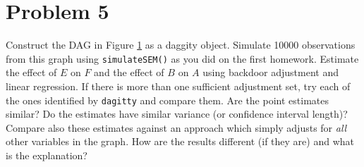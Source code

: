 \documentclass[letterpaper]{article}
\begin{document}
\section*{Problem 5}

Construct the DAG in Figure \ref{fig:prob6} as a daggity object. Simulate 10000 observations from this graph using \texttt{simulateSEM()} as you did on the first homework. Estimate the effect of $E$ on $F$ and the effect of $B$ on $A$ using backdoor adjustment and linear regression. If there is more than one sufficient adjustment set, try each of the ones identified by \texttt{dagitty} and compare them. Are the point estimates similar? Do the estimates have similar variance (or confidence interval length)? Compare also these estimates against an approach which simply adjusts for \emph{all} other variables in the graph. How are the results different (if they are) and what is the explanation?

\begin{figure}[h]
	\begin{center}
	\end{center}
	\caption{}
	\label{fig:prob6}
\end{figure}
\end{document}
